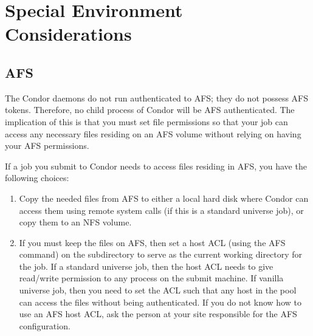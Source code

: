 

%





\section{Special Environment Considerations}

\subsection{AFS}

The Condor daemons do not run authenticated to AFS; they do not possess
AFS tokens.
Therefore, no child process of Condor will be AFS authenticated.
The implication of this is that you must set file permissions so
that your job can access any necessary files residing on an AFS volume
without relying on having your AFS permissions.

If a job you submit to Condor needs to access files residing in AFS,
you have the following choices:
\begin{enumerate}
\item Copy the needed files from AFS to either a local hard disk where 
Condor can access them using remote system calls (if
this is a standard universe job), or copy them to an NFS volume.
\item If you must keep the files on AFS, then set a host ACL
(using the AFS  command) on the subdirectory to
serve as the current working directory for the job.
If a standard universe job, then the host ACL needs
to give read/write permission to any process on the submit machine.
If vanilla universe job, then you need to set the ACL such that any host 
in the pool can access the files without being authenticated.
If you do not know how to use an AFS host ACL, ask the person at your 
site responsible for the AFS configuration.
\end{enumerate}

